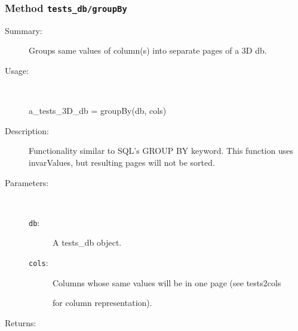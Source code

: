 \subsubsection[Method \texttt{groupBy}]{Method \texttt{tests\_db/groupBy}}%
%
\label{ref_tests_db__groupBy}%
\hypertarget{ref_tests_db__groupBy}{}%
\begin{description}
\item[Summary:]Groups same values of column(s) into separate pages of a 3D db.
%
\item[Usage:]~%
\begin{lyxcode}%
a\_tests\_3D\_db = groupBy(db, cols)
%
\end{lyxcode}%
%
\item[Description:]%
Functionality similar to SQL's GROUP BY keyword. This function
 uses invarValues, but resulting pages will not be sorted.
\item[Parameters:]~
\begin{description}%
\item[\texttt{db}:]
 A tests\_db object.
\item[\texttt{cols}:]
 Columns whose same values will be in one page (see tests2cols

for column representation).
\end{description}%
%
\item[Returns:
]~


\end{description}
